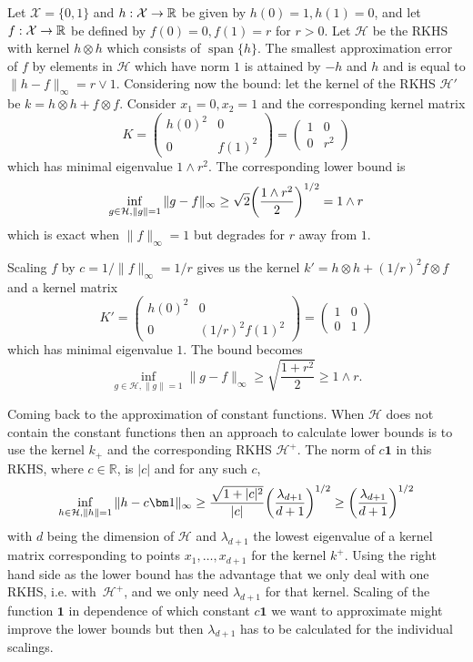 \documentclass[AHL,Unicode,longabstracts,published]{cedram}
\theoremstyle{remark}
\DeclareMathOperator{\spn}{span}
\newcommand{\R}{\mathbb{R}}
\newcommand{\X}{\mathcal{X}}
\newcommand{\cH}{\mathcal{H}}
\renewcommand*{\to}{\mathchoice{\longrightarrow}{\rightarrow}{\rightarrow}{\rightarrow}}
\let\originalleft\left
\let\originalright\right
\renewcommand{\left}{\mathopen{}\mathclose\bgroup\originalleft}
\renewcommand{\right}{\aftergroup\egroup\originalright}
\begin{document}
\begin{exam}
Let $\X =\{0,1\}$ and $h:\X \to \R$ be given by $h(0)= 1, h(1) =0$, and let $f: \X \to \R$ be defined by $f(0) = 0, f(1) = r$ for $r > 0$. Let $\cH$ be the RKHS with kernel $h\otimes h$ which consists of $\spn \{h\}$. The smallest approximation error of $f$ by elements in $\cH$ which have norm $1$ is attained by $-h$ and $h$ and is equal to $\|h - f\|_\infty = r\vee 1$. Considering now the bound: let the kernel of the RKHS $\cH'$ be $k = h \otimes h + f \otimes f$. Consider $x_1= 0, x_2 =1$ and the corresponding kernel matrix
\[
K =
\begin{pmatrix}
h(0)^2 & 0 \\
0 & f(1)^2
\end{pmatrix} =
\begin{pmatrix}
1 & 0 \\
0 & r^2
\end{pmatrix}
\]
which has minimal eigenvalue $1 \wedge r^2$. The corresponding lower bound is
\[
\inf_{g\in \cH, \|g\|=1} \|g - f\|_\infty \geq \sqrt{2} \left(\frac{1 \wedge r^2}{2} \right)^{1/2} = 1 \wedge r
\]
which is exact when $\|f\|_\infty = 1$ but degrades for $r$ away from $1$.

Scaling $f$ by $c = 1/\|f\|_\infty = 1/r$ gives us the kernel $k' = h \otimes h + (1/r)^2 f\otimes f$ and a kernel matrix
\[
K' =
\begin{pmatrix}
h(0)^2 & 0 \\
0 & (1/r)^2 f(1)^2
\end{pmatrix} =
\begin{pmatrix}
1 & 0 \\
0 & 1
\end{pmatrix}
\]
which has minimal eigenvalue $1$. The bound becomes
\[
\inf_{g\in \cH, \|g\|=1} \|g - f\|_\infty \geq \sqrt{\frac{1 + r^2}{2} } \geq 1 \wedge r.
\]
\end{exam}

Coming back to the approximation of constant functions. When $\cH$ does not contain the constant functions then an approach to calculate lower bounds is to use the kernel $k_+$ and the corresponding RKHS $\cH^+$. The norm of $c \bm 1$ in this RKHS, where $c \in \R$, is $|c|$ and for any such $c$,
\[
\inf_{h \in \cH, \|h\|=1} \|h-c \bm 1\|_\infty \geq \frac{\sqrt{1 + |c|^2}}{|c|} \left(\frac{\lambda_{d+1}}{d+1}\right)^{1/2} \geq \left(\frac{\lambda_{d+1}}{d+1}\right)^{1/2}
\]
with $d$ being the dimension of $\cH$ and $\lambda_{d+1}$ the lowest eigenvalue of a kernel matrix corresponding to points $x_1,\dots,x_{d+1}$ for the kernel $k^+$. Using the right hand side as the lower bound has the advantage that we only deal with one RKHS, i.e. with~$\cH^+$, and we only need $\lambda_{d+1}$ for that kernel. Scaling of the function $\bm 1$ in dependence of which constant $c \bm 1$ we want to approximate might improve the lower bounds but then $\lambda_{d+1}$ has to be calculated for the individual scalings.
\end{document}
